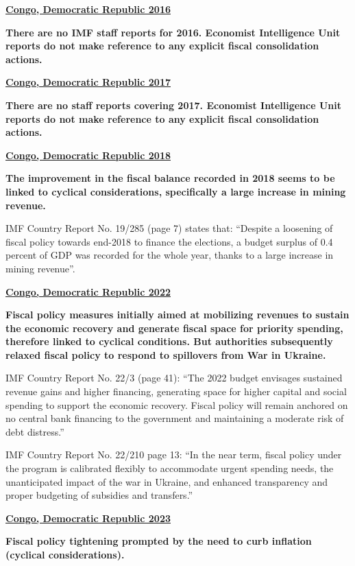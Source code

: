 \textbf{\underline{Congo, Democratic Republic 2016}}

\textbf{There are no IMF staff reports for 2016. Economist Intelligence Unit reports do not make reference to any explicit fiscal consolidation actions.}

\textbf{\underline{Congo, Democratic Republic 2017}}

\textbf{There are no staff reports covering 2017. Economist Intelligence Unit reports do not make reference to any explicit fiscal consolidation actions.}

\textbf{\underline{Congo, Democratic Republic 2018}}

\textbf{The improvement in the fiscal balance recorded in 2018 seems to be linked to cyclical considerations, specifically a large increase in mining revenue.}

IMF Country Report No. 19/285 (page 7) states that: “Despite a loosening of fiscal policy towards end-2018 to finance the elections, a budget surplus of 0.4 percent of GDP was recorded for the whole year, thanks to a large increase in mining revenue”.

\textbf{\underline{Congo, Democratic Republic 2022}}

\textbf{Fiscal policy measures initially aimed at mobilizing revenues to sustain the economic recovery and generate fiscal space for priority spending, therefore linked to cyclical conditions. But authorities subsequently relaxed fiscal policy to respond to spillovers from War in Ukraine.} 

IMF Country Report No. 22/3 (page 41): “The 2022 budget envisages sustained revenue gains and higher financing, generating space for higher capital and social spending to support the economic recovery. Fiscal policy will remain anchored on no central bank financing to the government and maintaining a moderate risk of debt distress.”

IMF Country Report No. 22/210 page 13: “In the near term, fiscal policy under the program is calibrated flexibly to accommodate urgent spending needs, the unanticipated impact of the war in Ukraine, and enhanced transparency and proper budgeting of subsidies and transfers.”

\textbf{\underline{Congo, Democratic Republic 2023}}

\textbf{Fiscal policy tightening prompted by the need to curb inflation (cyclical considerations).}

